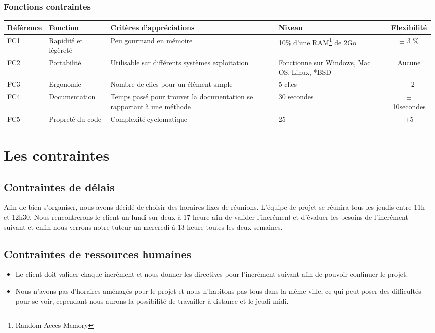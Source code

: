 \documentclass[12pt,a4paper,openany]{article}
\begin{document}
	\subsubsection{Fonctions contraintes}
	\begin{tabular}{|p{2cm}|p{3cm}|p{5cm}|p{3cm}|c|}
		\hline
		\textbf{Référence}& \textbf{Fonction} & \textbf{Critères d'appréciations} & \textbf{Niveau} & \textbf{Flexibilité} \\
		\hline
			FC1 & Rapidité et légèreté & Peu gourmand en mémoire & 10\% d'une RAM\footnote{Random Acces Memory} de 2Go & $\pm$ 3 \%\\
		\hline
			FC2 & Portabilité & Utilisable sur différents systèmes exploitation & Fonctionne sur Windows, Mac OS, Linux, *BSD & Aucune \\
		\hline
			FC3 & Ergonomie & Nombre de clics pour un élément simple & 5 clics & $\pm$ 2\\
		\hline
			FC4 & Documentation & Temps passé pour trouver la documentation se rapportant à une méthode &30 secondes& $\pm$10secondes \\ 
		\hline
			FC5 & Propreté du code & Complexité cyclomatique& 25 & +5\\ 
		\hline
	\end{tabular}
	\section{Les contraintes}
	\subsection{Contraintes de délais}
	Afin de bien s'organiser, nous avons décidé de choisir des horaires fixes de réunions. L'équipe de projet se réunira tous
	les jeudis entre 11h et 12h30. Nous rencontrerons le client un lundi sur deux à 17 heure afin de valider l'incrément et d'évaluer les
	besoins de l'incrément suivant et enfin nous verrons notre tuteur un mercredi à 13 heure toutes les deux semaines. \\

	\subsection{Contraintes de ressources humaines}
	\begin{itemize}
		\item Le client doit valider chaque incrément et nous donner les directives pour l'incrément suivant afin de pouvoir continuer le projet. 
		\item Nous n'avons pas d'horaires aménagés pour le projet et nous n'habitons pas tous dans la même ville, ce qui peut poser des difficultés pour se voir, cependant nous aurons la possibilité de travailler à distance et le jeudi midi.
	\end{itemize}
\end{document}

